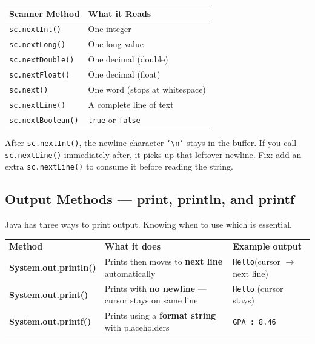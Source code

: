 \documentclass[12pt,a4paper,oneside]{book}
\renewcommand{\arraystretch}{1.35}
\begin{document}
\begin{center}
\begin{tabular}{ll}
\toprule
\textbf{Scanner Method} & \textbf{What it Reads}\\
\midrule
\texttt{sc.nextInt()}      & One integer\\
\texttt{sc.nextLong()}     & One long value\\
\texttt{sc.nextDouble()}   & One decimal (double)\\
\texttt{sc.nextFloat()}    & One decimal (float)\\
\texttt{sc.next()}         & One word (stops at whitespace)\\
\texttt{sc.nextLine()}     & A complete line of text\\
\texttt{sc.nextBoolean()}  & \texttt{true} or \texttt{false}\\
\bottomrule
\end{tabular}
\end{center}

\begin{warningbox}
After \texttt{sc.nextInt()}, the newline character \texttt{`\textbackslash n'} stays in the buffer. If you call \texttt{sc.nextLine()} immediately after, it picks up that leftover newline. Fix: add an extra \texttt{sc.nextLine()} to consume it before reading the string.
\end{warningbox}

\subsection{Output Methods --- print, println, and printf}

Java has three ways to print output. Knowing when to use which is essential.

\begin{center}
\renewcommand{\arraystretch}{1.55}
{\small
\begin{tabular}{
  !{\color{myblue}\vrule width 1.2pt}
  >{\bfseries\ttfamily}p{3.9cm}
  !{\color{myblue!40}\vrule}
  p{4.6cm}
  !{\color{myblue!40}\vrule}
  p{3.0cm}
  !{\color{myblue}\vrule width 1.2pt}
}
\hline
{}
\color{white}\textbf{Method} &
\color{white}\textbf{What it does} &
\color{white}\textbf{Example output}\\
\hline
{}
System.out.\newline println() & Prints then moves to \textbf{next line} automatically & \texttt{Hello}\newline(cursor $\to$ next line)\\
System.out.print() & Prints with \textbf{no newline} --- cursor stays on same line & \texttt{Hello} (cursor stays)\\
System.out.printf() & Prints using a \textbf{format string} with placeholders & \texttt{GPA : 8.46}\\
\hline
\end{tabular}}
\end{center}
\end{document}
